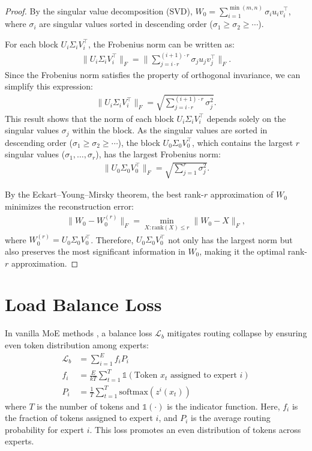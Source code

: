 \begin{proof}
By the singular value decomposition (SVD), \( W_0 = \sum_{i=1}^{\min(m, n)} \sigma_i u_i v_i^\top \), where \( \sigma_i \) are singular values sorted in descending order (\( \sigma_1 \geq \sigma_2 \geq \cdots \)).

For each block \( U_i \Sigma_i V_i^\top \), the Frobenius norm can be written as:
\begin{align}
\|U_i \Sigma_i V_i^\top\|_F = \Big\|\sum_{j=i \cdot r}^{(i+1) \cdot r} \sigma_j u_j v_j^\top \Big\|_F.
\end{align}
Since the Frobenius norm satisfies the property of orthogonal invariance, we can simplify this expression:
\begin{align}
\|U_i \Sigma_i V_i^\top\|_F = \sqrt{\sum_{j=i \cdot r}^{(i+1) \cdot r} \sigma_j^2}.
\end{align}
This result shows that the norm of each block \( U_i \Sigma_i V_i^\top \) depends solely on the singular values \( \sigma_j \) within the block. As the singular values are sorted in descending order (\( \sigma_1 \geq \sigma_2 \geq \cdots \)), the block \( U_0 \Sigma_0 V_0^\top \), which contains the largest \( r \) singular values (\( \sigma_1, \ldots, \sigma_r \)), has the largest Frobenius norm:
\begin{align}
\|U_0 \Sigma_0 V_0^\top\|_F = \sqrt{\sum_{j=1}^r \sigma_j^2}.
\end{align}

By the Eckart–Young–Mirsky theorem, the best rank-\( r \) approximation of \( W_0 \) minimizes the reconstruction error:
\begin{align}
\|W_0 - W_0^{(r)}\|_F = \min_{X : \text{rank}(X) \leq r} \|W_0 - X\|_F,
\end{align}
where \( W_0^{(r)} = U_0 \Sigma_0 V_0^\top \). Therefore, \( U_0 \Sigma_0 V_0^\top \) not only has the largest norm but also preserves the most significant information in \( W_0 \), making it the optimal rank-\( r \) approximation.
\end{proof}

\section{Load Balance Loss}\label{sec:lb}

In vanilla MoE methods \cite{fedus2022switch,dai2024deepseekmoeultimateexpertspecialization}, a balance loss $\mathcal{L}_b$ mitigates routing collapse by ensuring even token distribution among experts:
\begin{align}
    \mathcal{L}_b &= \sum_{i=1}^E f_i P_i \label{eq:lb} \\
    f_i &= \frac{E}{kT} \sum_{t=1}^T \mathds{1}(\text{Token } x_t \text{ assigned to expert } i) \label{eq:f} \\
    P_i &= \frac{1}{T} \sum_{t=1}^T \text{softmax}(z^i(x_t))
\end{align}
where $T$ is the number of tokens and $\mathds{1}(\cdot)$ is the indicator function. Here, $f_i$ is the fraction of tokens assigned to expert $i$, and $P_i$ is the average routing probability for expert $i$. This loss promotes an even distribution of tokens across experts.

